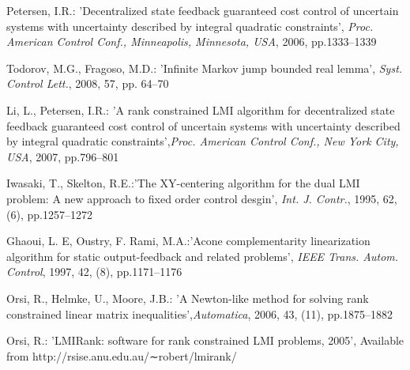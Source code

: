 \documentclass[11pt,draftcls,onecolumn]{IEEEtran}
\begin{document}
\begin{thebibliography}{0}
Petersen, I.R.: 'Decentralized state feedback guaranteed cost control of uncertain systems with uncertainty described by integral quadratic constraints',  \emph{Proc. American Control Conf.,
Minneapolis, Minnesota, USA}, 2006, pp.1333--1339


Todorov, M.G., Fragoso,  M.D.: 'Infinite Markov jump bounded real lemma', \emph{Syst. Control Lett.},  2008, 57, pp. 64--70

Li, L., Petersen, I.R.: 'A rank constrained LMI algorithm for decentralized state feedback guaranteed cost control of uncertain systems with uncertainty described by integral quadratic constraints',\emph{Proc. American Control Conf.,
New York City, USA}, 2007, pp.796--801



Iwasaki, T., Skelton, R.E.:'The XY-centering algorithm for the dual LMI problem: A new
approach to ﬁxed order control desgin', \emph{Int. J. Contr.},  1995, 62, (6), pp.1257--1272

Ghaoui, L. E, Oustry, F. Rami, M.A.:'Acone complementarity linearization algorithm for static output-feedback and related problems', \emph{IEEE Trans. Autom. Control}, 1997, 42, (8),
 pp.1171--1176

Orsi, R., Helmke, U., Moore, J.B.: 'A Newton-like method for solving rank constrained linear matrix inequalities',\emph{Automatica}, 2006, 43, (11), pp.1875--1882

Orsi, R.: 'LMIRank: software for rank constrained LMI problems,
2005', Available from http://rsise.anu.edu.au/∼robert/lmirank/



\end{thebibliography}
\end{document}
